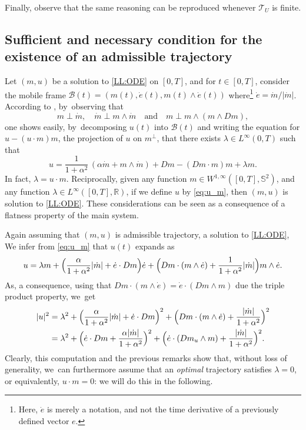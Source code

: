 \documentclass[10pt]{amsart}
\theoremstyle{definition}
\begin{document}
Finally, observe that the same reasoning can be reproduced whenever $\mathcal{T}_U$ is finite.

\subsection{Sufficient and necessary condition for the existence of an admissible trajectory}

Let $(m,u)$ be a solution to \eqref{LL:ODE} on $[0,T]$, and for $t \in [0,T]$, consider the mobile frame $\mathcal{B}(t)=(m(t),\dot e(t),m(t)\wedge \dot e(t))$ where\footnote{Here, $\dot e$ is merely a notation, and not the time derivative of a previously defined vector $e$.} $\dot{e}=\dot{m}/|\dot{m}|$. According to \cite{alouges2009magnetization}, by~observing that
\[
m \perp \dot m, \quad \dot m \perp m \wedge \dot m \quad \text{and}\quad m \perp m \wedge (m\wedge Dm),
\]
one shows easily, by~decomposing $u(t)$ into $\mathcal{B}(t)$ and writing the equation for \hbox{$u - (u \cdot m) m$}, the projection of $u$ on $m^\perp$, that there exists $\lambda\in L^\infty (0,T)$ such that
\begin{equation} \label{eq:u_m}
u = \frac{1}{1+\alpha^2}\,(\alpha \dot m + m \wedge \dot m)+Dm-(Dm\cdot m)m+\lambda m.
\end{equation}
In fact, $\lambda = u\cdot m$. Reciprocally, given any function $m \in W^{1,\infty}([0,T],\mathbb S^2)$, and any function $\lambda \in L^\infty([0,T],\mathbb R)$, if we define $u$ by \eqref{eq:u_m}, then $(m,u)$ is solution to \eqref{LL:ODE}. These considerations can be seen as a consequence of a flatness property of the main system.

Again assuming that $(m,u)$ is admissible trajectory, \ie a solution to \eqref{LL:ODE}, We infer from \eqref{eq:u_m} that $u(t)$ expands as
\begin{equation}\label{eq:uexpand}
u=\lambda m +\Bigl(\frac{\alpha}{1+\alpha^2}|\dot m|+\dot e\cdot Dm \Bigr)\dot e+\Bigl(Dm \cdot (m \wedge \dot e)+\frac{1}{1+\alpha^2}|\dot m|\Bigr)m \wedge \dot e.
\end{equation}
As, a consequence, using that $Dm \cdot (m \wedge \dot e)=\dot e\cdot (Dm \wedge m)$ due the triple product property, we~get
\begin{align*}
|u|^2 &= \lambda^2+\Bigl(\frac{\alpha}{1+\alpha^2}|\dot m|+\dot e\cdot Dm\Bigr)^2+\Bigl(Dm\cdot (m\wedge \dot e)+\frac{|\dot m|}{1+\alpha^2}\Bigr)^2\\
&= \lambda^2+\Bigl(\dot e\cdot Dm+\frac{\alpha|\dot m|}{1+\alpha^2}\Bigr)^2+\Bigl(\dot e\cdot (Dm_u\wedge m)+\frac{|\dot m|}{1+\alpha^2}\Bigr)^2.
\end{align*}
Clearly, this computation and the previous remarks show that, without loss of generality, we~can furthermore assume that an \emph{optimal} trajectory satisfies $\lambda=0$, or equivalently, $u \cdot m =0$: we will do this in the following.
\end{document}
